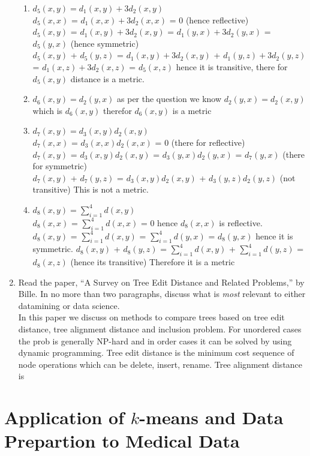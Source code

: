 \documentclass{article}
\begin{document}
\begin{enumerate}
\begin{enumerate}
\item $d_5(x,y) = d_1(x,y) + 3d_2(x,y)$ \\
$d_5(x,x)$ = $d_1(x,x) + 3d_2(x,x)$ = 0 (hence reflective) \\
$d_5(x,y)$ = $d_1(x,y) + 3d_2(x,y)$ = $d_1(y,x) + 3d_2(y,x)$ = $d_5(y,x)$ (hence symmetric) \\
$d_5(x,y)$  + $d_5(y,z)$ = $d_1(x,y) + 3d_2(x,y)$ + $d_1(y,z) + 3d_2(y,z)$= $d_1(x,z) + 3d_2(x,z)$ = $d_5(x,z)$  hence it is transitive, there for $d_5(x,y)$ distance is a metric.
\item $d_6(x,y) = d_2(y,x)$ 
as per the question we know $d_2(y,x) = d_2(x,y)$ which is $d_6(x,y)$ therefor $d_6(x,y)$ is a metric
\item $d_7(x,y) = d_3(x,y)d_2(x,y)$  \\
$d_7(x,x)$ = $d_3(x,x)d_2(x,x)$ = 0 (there for reflective) \\
$d_7(x,y)$ = $d_3(x,y)d_2(x,y)$ = $d_3(y,x)d_2(y,x)$ = $d_7(y,x)$ (there for symmetric) \\
$d_7(x,y)$ + $d_7(y,z)$ = $d_3(x,y)d_2(x,y)$ + $d_3(y,z)d_2(y,z)$ (not transitive) This is not a metric.
\item $d_8(x,y) = \sum_{i=1}^{4}d(x,y)$ \\

$d_8(x,x)$ = $\sum_{i=1}^{4}d(x,x)$ = 0 hence $d_8(x,x)$ is reflective. \\
$d_8(x,y)$ = $\sum_{i=1}^{4}d(x,y)$ = $\sum_{i=1}^{4}d(y,x)$ = $d_8(y,x)$ hence it is symmetric.
$d_8(x,y)$ + $d_8(y,z)$ = $\sum_{i=1}^{4}d(x,y)$ + $\sum_{i=1}^{4}d(y,z)$ = $d_8(x,z)$ (hence its transitive) 
Therefore it is a metric

\end{enumerate}
\item Read the paper, ``A Survey on Tree Edit Distance and Related Problems,'' by Bille\cite{Bille:2005:STE:1085274.1085283}.  In no more than two paragraphs, discuss what is {\it most} relevant to either datamining or data science. \\
In this paper we discuss on methods to compare trees based on tree edit distance, tree alignment distance and inclusion problem. For unordered cases the prob is generally NP-hard and in order cases it can be solved by using dynamic programming. Tree edit distance is the minimum cost sequence of node operations which can be delete, insert, rename. Tree alignment distance is 
\end{enumerate}

\section*{Application of $k$-means and Data Prepartion to Medical Data}
\end{document}
